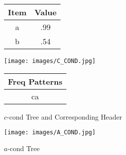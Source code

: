 \begin{figure}
\begin{minipage}{0.30\textwidth}
  \centering
	\begin{center}
	\begin{tabular}{ |c|c| } 
 	\hline
 		Item&Value\\ \hline\hline
 		a &  .99  	\\ \hline
 		b &  .54   	\\ \hline
\end{tabular}
\end{center}  
\end{minipage}
  \hfill
\begin{minipage}{0.29\textwidth}
  \centering
  \hfill
  \texttt{[image: images/C\_COND.jpg]}
  \hfill  
\end{minipage}
\hfill
\begin{minipage}{0.30\textwidth}
  \centering  
	\begin{center}
	\begin{tabular}{ |c| } 
 	\hline
 		Freq Patterns \\ \hline\hline
 		ca  	\\ \hline
 		
\end{tabular}
\end{center}   
\end{minipage}
\caption{$c$-cond Tree and Corresponding Header}
\label{figure:c_cond}
\end{figure}
\begin{figure}
\centering
  \texttt{[image: images/A\_COND.jpg]}
\caption{$a$-cond Tree}
\label{figure:a_cond}
\end{figure}

%
